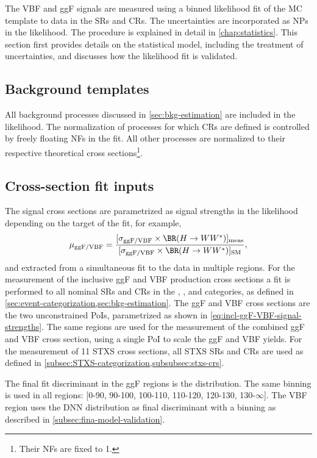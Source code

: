 
The VBF and ggF signals are measured using a binned likelihood fit of the MC template to data in the SRs and CRs. The uncertainties are incorporated as NPs in the likelihood. The procedure is explained in detail in \cref{chap:statistics}. 
This section first provides details on the statistical model, including the treatment of uncertainties, and discusses how the likelihood fit is validated.

\subsection{Background templates}
All background processes discussed in \cref{sec:bkg-estimation} are included in the likelihood. 
The normalization of processes for which CRs are defined is controlled by freely floating NFs in the fit. All other processes are normalized to their respective theoretical cross sections\footnote{Their NFs are fixed to 1.}.

\subsection{Cross-section fit inputs}
The signal cross sections are parametrized as signal strengths in the likelihood depending on the target of the fit, for example,
\begin{equation}
    \label{eq:incl-ggF-VBF-signal-strengths}
    \mu_{\text{ggF/VBF}} = \frac{ [ \sigma_{\text{ggF/VBF}}  \times \BR(H \to WW^*) ]_\text{meas} } { [ \sigma_{\text{ggF/VBF}} \times \BR(H \to WW^*) ]_\text{SM}},
\end{equation}
and extracted from a simultaneous fit to the data in multiple regions.
For the measurement of the inclusive ggF and VBF production cross sections a fit is performed to all nominal SRs and CRs in the \ZeroJet, \OneJet, and \TwoJet categories, as defined in \cref{sec:event-categorization,sec:bkg-estimation}. 
The ggF and VBF cross sections are the two unconstrained PoIs, parametrized as shown in \cref{eq:incl-ggF-VBF-signal-strengths}.
The same regions are used for the measurement of the combined ggF and VBF cross section, using a single PoI to scale the ggF and VBF yields. 
For the measurement of 11 STXS cross sections, all STXS SRs and CRs are used as defined in \cref{subsec:STXS-categorization,subsubsec:stxs-crs}.

The final fit discriminant in the ggF regions is the \mT distribution. The same binning is used in all regions: [0-90, 90-100, 100-110, 110-120, 120-130, 130-$\infty$]. 
The VBF region uses the DNN distribution as final discriminant with a binning as described in \cref{subsec:fina-model-validation}.

